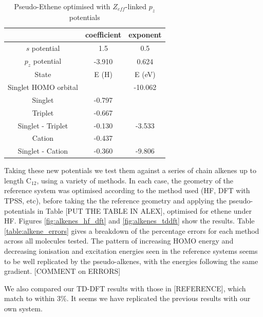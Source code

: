 \documentclass[journal=jctcce,manuscript=article]{achemso}
\begin{document}
\begin{table}[ht]
\caption{Pseudo-Ethene optimised with \(Z_{eff}\)-linked \(p_{z}\) potentials}
\begin{tabular}{c c c}
\hline\hline
& coefficient & exponent \\
\hline
\(s\) potential & 1.5 & 0.5 \\
\(p_{z}\) potential & -3.910 & 0.624 \\
\hline
State & E (H) & E (eV) \\
\hline
Singlet HOMO orbital & & -10.062 \\
Singlet & -0.797 & \\
Triplet & -0.667 & \\
Singlet - Triplet & -0.130 & -3.533 \\
Cation & -0.437 & \\
Singlet - Cation & -0.360 & -9.806 \\
\hline
\end{tabular}
\label{table:early_ethene_excitations}
\end{table}

Taking these new potentials we test them against a series of chain alkenes up to length C\(_{12}\), using a variety of methods. In each case, the geometry of the reference system was optimised according to the method used (HF, DFT with TPSS, etc), before taking the the reference geometry and applying the pseudo-potentials in Table [PUT THE TABLE IN ALEX], optimised for ethene under HF. Figures \ref{fig:alkenes_hf_dft} and \ref{fig:alkenes_tddft} show the results. Table \ref{table:alkene_errors} gives a breakdown of the percentage errors for each method across all molecules tested. The pattern of increasing HOMO energy and decreasing ionisation and excitation energies seen in the reference systems seems to be well replicated by the pseudo-alkenes, with the energies following the same gradient. [COMMENT on ERRORS]

We also compared our TD-DFT results with those in [REFERENCE], which match to within 3\%. It seems we have replicated the previous results with our own system.
\end{document}
